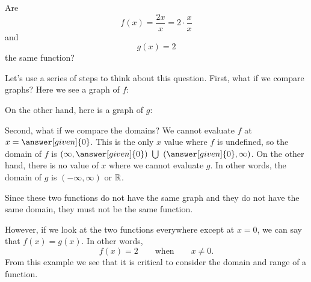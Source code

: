 \documentclass{ximera}
\begin{document}
\begin{example}
  Are 
  \[
  f(x) = \frac{2x}{x} = 2 \cdot \frac{x}{x}
  \]
  and
  \[
  g(x) = 2
  \]
  the same function?
  \begin{explanation}
  Let's use a series of steps to think about this question. 
    First, what if we compare graphs? Here we see a graph of
    $f$:
    \begin{image}
\end{image}
On the other hand, here is a graph of $g$:
\begin{image}
\end{image}
Second, what if we compare the domains?  We cannot evaluate $f$ at
$x=\answer[given]{0}$.  This is the only $x$ value where $f$ is undefined, so the domain of $f$ is $\left(\infty, \answer[given]{0}\right) \ \bigcup \ \left(\answer[given]{0}, \infty\right)$.  On the other
hand, there is no value of $x$ where we cannot evaluate $g$.  In other
words, the domain of $g$ is $(-\infty, \infty)$ or $\mathbb R$.

Since these two functions do not have the same graph and they do not
have the same domain, they must not be the same function.

However, if we look at the two functions everywhere except at $x = 0$, 
we can say that $f(x)=g(x)$.  In other words, 
\[
f(x)=2\qquad\text{when}\qquad \text{$x \ne 0$}.
\]
From this example we see that it is critical to consider the domain and
range of a function.
  \end{explanation}
\end{example}
\end{document}
